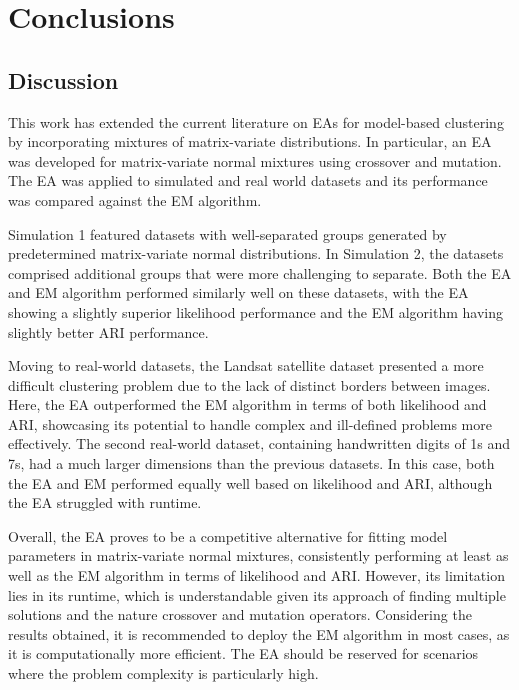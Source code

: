 \documentclass[12pt]{report}
\begin{document}


\chapter{Conclusions}




\section{Discussion}
This work has extended the current literature on EAs for model-based clustering by incorporating mixtures of matrix-variate distributions. In particular, an EA was developed for matrix-variate normal mixtures using crossover and mutation. The EA was applied to simulated and real world datasets and its performance was compared against the EM algorithm. 

Simulation 1 featured datasets with well-separated groups generated by predetermined matrix-variate normal distributions. In Simulation 2, the datasets comprised additional groups that were more challenging to separate. Both the EA and EM algorithm performed similarly well on these datasets, with the EA showing a slightly superior likelihood performance and the EM algorithm having slightly better ARI performance.

Moving to real-world datasets, the Landsat satellite dataset presented a more difficult clustering problem due to the lack of distinct borders between images. Here, the EA outperformed the EM algorithm in terms of both likelihood and ARI, showcasing its potential to handle complex and ill-defined problems more effectively. The second real-world dataset, containing handwritten digits of 1s and 7s, had a much larger dimensions than the previous datasets. In this case, both the EA and EM performed equally well based on likelihood and ARI, although the EA struggled with runtime. 

Overall, the EA proves to be a competitive alternative for fitting model parameters in matrix-variate normal mixtures, consistently performing at least as well as the EM algorithm in terms of likelihood and ARI. However, its limitation lies in its runtime, which is understandable given its approach of finding multiple solutions and the nature crossover and mutation operators. Considering the results obtained, it is recommended to deploy the EM algorithm in most cases, as it is computationally more efficient. The EA should be reserved for scenarios where the problem complexity is particularly high.
\end{document}

